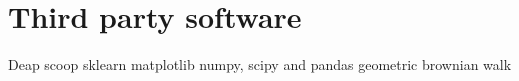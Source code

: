 \chapter{Third party software}
\label{AppendixB} %


Deap
scoop
sklearn
matplotlib
numpy, scipy and pandas
geometric brownian walk
